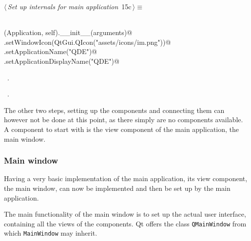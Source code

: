 \documentclass[
    a4paper,      %
    10pt,         %
    openright,    %
    notitlepage,  %
    parskip=half, %
]{scrreprt}       %
\theoremstyle{definition}                    %
\begin{document}
\begin{flushleft} \small
\begin{minipage}{\linewidth}\label{scrap4}\raggedright\small
{} $\langle\,${\itshape Set up internals for main application}\nobreak\ {\footnotesize {15c}}$\,\rangle\equiv$
\vspace{-1ex}
\begin{list}{}{} \item
\mbox{}\lstinline@@\\
\mbox{}\lstinline@super(Application, self).__init__(arguments)@\\
\mbox{}\lstinline@self.setWindowIcon(QtGui.QIcon("assets/icons/im.png"))@\\
\mbox{}\lstinline@self.setApplicationName("QDE")@\\
\mbox{}\lstinline@self.setApplicationDisplayName("QDE")@{\NWsep}
\end{list}
\vspace{-1.5ex}
\footnotesize
\begin{list}{}{\setlength{\itemsep}{-\parsep}\setlength{\itemindent}{-\leftmargin}}
\item \NWtxtMacroDefBy\ .
\item \NWtxtMacroRefIn\ .

\item{}
\end{list}
\end{minipage}\vspace{4ex}
\end{flushleft}
The other two steps, setting up the components and connecting them can however
not be done at this point, as there simply are no components available. A
component to start with is the view component of the main application, the main
window.

\subsubsection{Main window}
\label{ssubsec:main-window}

Having a very basic implementation of the main application, its view component,
the main window, can now be implemented and then be set up by the main
application.

The main functionality of the main window is to set up the actual user
interface, containing all the views of the components. Qt offers the class
\verb+QMainWindow+ from which \verb=MainWindow= may inherit.
\end{document}
